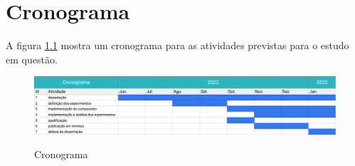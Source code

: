 \chapter{Cronograma}

A figura \ref{fig:introduction:agenda} mostra um cronograma para as atividades previstas para o estudo em questão.

\begin{figure}[H]
    \centering
    \caption{Cronograma}
    \includegraphics[width=1.0\textwidth]{resources/images/introducao/agenda.png}
    \label{fig:introduction:agenda}
\end{figure}
